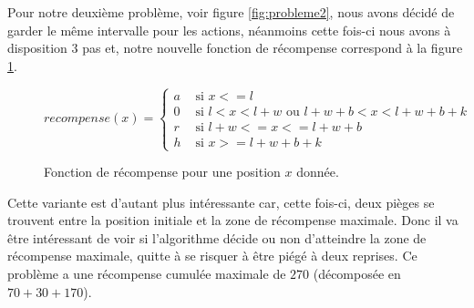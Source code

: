 \documentclass[pdftex,french, english]{article}	%
\begin{document}
    Pour notre deuxième problème, voir figure \ref{fig:probleme2}, nous avons décidé de garder le même intervalle pour les actions, néanmoins cette fois-ci nous avons à disposition $3$ pas et, notre nouvelle fonction de récompense correspond à la figure \ref{recompense2}.
    \begin{figure}[H]
      $$recompense(x) = \left\{
      \begin{array}{ll}
      a & \mbox{ si $x <= l$}\\
      0 & \mbox{ si $l < x < l + w$ ou $l + w + b < x < l + w + b + k$}\\
      r & \mbox{ si $l + w <= x <= l + w + b$}\\ 
      h & \mbox{ si $x >= l + w + b + k$}
      \end{array}\right.$$
      \caption{Fonction de récompense pour une position $x$ donnée.}
      \label{recompense2}
    \end{figure}
 
 Cette variante est d'autant plus intéressante car, cette fois-ci, deux pièges se trouvent entre la position initiale et la zone de récompense maximale. Donc il va être intéressant de voir si l'algorithme décide ou non d'atteindre la zone de récompense maximale, quitte à se risquer à être piégé à deux reprises. Ce problème a une récompense cumulée maximale de $270$ (décomposée en $70 + 30 + 170$).
 
\end{document}
